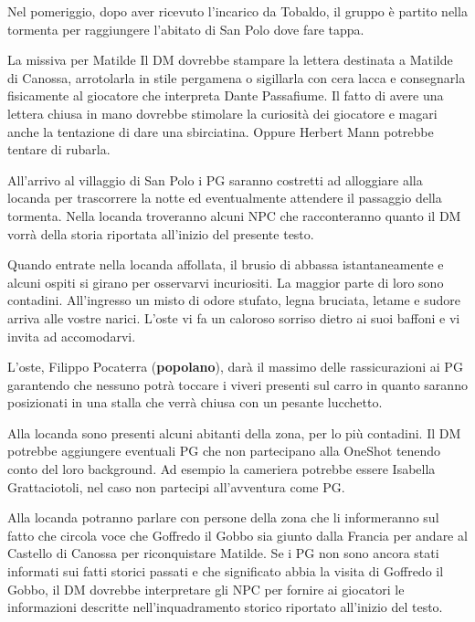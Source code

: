 \documentclass[letterpaper,twocolumn,openany,nodeprecatedcode]{dndbook}
\begin{document}
Nel pomeriggio, dopo aver ricevuto l'incarico da Tobaldo, il gruppo è partito nella tormenta per raggiungere l'abitato di San Polo dove fare tappa.

\begin{DndSidebar}{La missiva per Matilde}
Il DM dovrebbe stampare la lettera destinata a Matilde di Canossa, arrotolarla in stile pergamena o sigillarla con cera lacca e consegnarla fisicamente al giocatore che interpreta Dante Passafiume. Il fatto di avere una lettera chiusa in mano dovrebbe stimolare la curiosità dei giocatore e magari anche la tentazione di dare una sbirciatina. Oppure Herbert Mann potrebbe tentare di rubarla.
\end{DndSidebar}

All'arrivo al villaggio di San Polo i PG saranno costretti ad alloggiare alla locanda per trascorrere la notte ed eventualmente attendere il passaggio della tormenta. Nella locanda troveranno alcuni NPC che racconteranno quanto il DM vorrà della storia riportata all'inizio del presente testo.

\begin{DndReadAloud}
Quando entrate nella locanda affollata, il brusio di abbassa istantaneamente e alcuni ospiti si girano per osservarvi incuriositi. La maggior parte di loro sono contadini. All'ingresso un misto di odore stufato, legna bruciata, letame e sudore arriva alle vostre narici. L'oste vi fa un caloroso sorriso dietro ai suoi baffoni e vi invita ad accomodarvi.
\end{DndReadAloud}

L'oste, Filippo Pocaterra (\textbf{popolano}), darà il massimo delle rassicurazioni ai PG garantendo che nessuno potrà toccare i viveri presenti sul carro in quanto saranno posizionati in una stalla che verrà chiusa con un pesante lucchetto.




Alla locanda sono presenti alcuni abitanti della zona, per lo più contadini. Il DM potrebbe aggiungere eventuali PG che non partecipano alla OneShot tenendo conto del loro background. Ad esempio la cameriera potrebbe essere Isabella Grattaciotoli, nel caso non partecipi all'avventura come PG.

Alla locanda potranno parlare con persone della zona che li informeranno sul fatto che circola voce che Goffredo il Gobbo sia giunto dalla Francia per andare al Castello di Canossa per riconquistare Matilde. Se i PG non sono ancora stati informati sui fatti storici passati e che significato abbia la visita di Goffredo il Gobbo, il DM dovrebbe interpretare gli NPC per fornire ai giocatori le informazioni descritte nell'inquadramento storico riportato all'inizio del testo.
\end{document}

